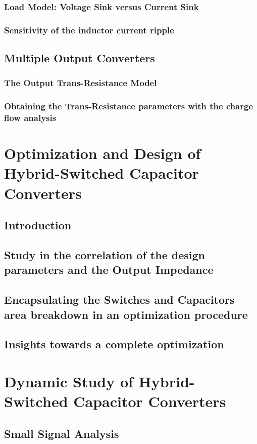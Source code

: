 \subsection{Load Model: Voltage Sink versus Current Sink}
\subsection{Sensitivity of the inductor current ripple}

\section{Multiple Output Converters}
\subsection{The Output Trans-Resistance Model}
\subsection{Obtaining the Trans-Resistance parameters with the charge flow analysis }







\chapter[Optimization and Design]{Optimization and Design of Hybrid-Switched Capacitor Converters}
\section{Introduction}
\section{Study in the correlation of the design parameters and the Output Impedance}
\section{Encapsulating the Switches and Capacitors area breakdown in an optimization procedure}
\section{Insights towards a complete optimization}

\chapter[Dynamic Study]{Dynamic Study of Hybrid-Switched Capacitor Converters}
\section{Small Signal Analysis}


